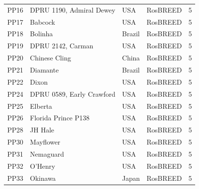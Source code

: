 \documentclass[12pt]{article}
\begin{document}
\begin{center}
\begin{longtable}{llllc}
	PP16 &DPRU 1190, Admiral Dewey&USA &RosBREED &5\\
	PP17 &Babcock &USA &RosBREED &5\\
	PP18 &Bolinha &Brazil &RosBREED &5\\
	PP19 &DPRU 2142, Carman &USA &RosBREED &5\\
	PP20 &Chinese Cling&China &RosBREED &5\\
	PP21 &Diamante&Brazil &RosBREED &5\\
	PP22 &Dixon&USA &RosBREED &5\\
	PP24 &DPRU 0589, Early Crawford &USA &RosBREED &5\\
	PP25 &Elberta&USA &RosBREED &5\\
	PP26 &Florida Prince P138&USA &RosBREED &5\\
	PP28 &JH Hale&USA &RosBREED &5\\
	PP30 &Mayflower&USA &RosBREED &5\\
	PP31 &Nemaguard &USA &RosBREED &5\\
	PP32 &O'Henry &USA &RosBREED &5\\
	PP33 &Okinawa &Japan &RosBREED &5\\

\end{longtable}
\end{center}
\end{document}
